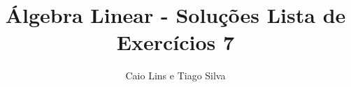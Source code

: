 \documentclass[leqno]{article}
\begin{document}

\theoremstyle{definition}
\newtheorem{defi}[teo]{Definição} \newtheorem*{defi*}{Definição}
\newtheorem{exem}[teo]{Exemplo} \newtheorem*{exem*}{Exemplo}
\newtheorem{obs}[teo]{Observação} \newtheorem*{obs*}{Observação}
\newtheorem*{hipo}{Hipóteses}
\newtheorem*{nota}{Notação}


\newcommand{\ds}{\displaystyle} \newcommand{\nl}{\newline}
\newcommand{\eps}{\varepsilon} \newcommand{\ssty}{\scriptstyle}
\newcommand{\bE}{\mathbb{E}}
\newcommand{\cB}{\mathcal{B}}
\newcommand{\cF}{\mathcal{F}}
\newcommand{\cA}{\mathcal{A}}
\newcommand{\cM}{\mathcal{M}}
\newcommand{\cD}{\mathcal{D}}
\newcommand{\cN}{\mathcal{N}}
\newcommand{\cL}{\mathcal{L}}
\newcommand{\cLN}{\mathcal{LN}}
\newcommand{\bP}{\mathbb{P}}
\newcommand{\bQ}{\mathbb{Q}}
\newcommand{\bN}{\mathbb{N}}
\newcommand{\bR}{\mathbb{R}}
\newcommand{\bZ}{\mathbb{Z}}

\newcommand{\bfw}{\mathbf{w}}
\newcommand{\bfv}{\mathbf{v}}
\newcommand{\bfu}{\mathbf{u}}
\newcommand{\bfx}{\mathbf{x}}
\newcommand{\bfy}{\mathbf{y}}
\newcommand{\bfa}{\mathbf{a}}
\newcommand{\bfb}{\mathbf{b}}
\newcommand{\bfc}{\mathbf{c}}
\newcommand{\bfd}{\mathbf{d}}

\newcommand{\bvecc}[2]{%
  \begin{bmatrix} #1 \\ #2  \end{bmatrix}
}
\newcommand{\bveccc}[3]{%
  \begin{bmatrix} #1 \\ #2 \\ #3  \end{bmatrix}
}

\newenvironment{sol} 
{
    \vspace{4mm}
    \noindent\textbf{Resolução:}
    \strut\newline
    \smallskip
    \hspace{-3.5mm} 
} 
{\noindent\rule{4cm}{.1mm}}

\title{Álgebra Linear - Soluções Lista de Exercícios 7}

\author{Caio Lins e Tiago Silva}
\end{document}
